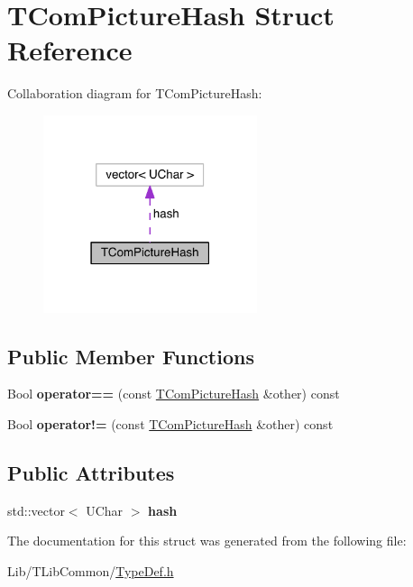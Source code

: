 \hypertarget{struct_t_com_picture_hash}{}\section{T\+Com\+Picture\+Hash Struct Reference}
\label{struct_t_com_picture_hash}


Collaboration diagram for T\+Com\+Picture\+Hash\+:
\nopagebreak
\begin{figure}[H]
\begin{center}
\leavevmode
\includegraphics[width=178pt]{d0/d47/struct_t_com_picture_hash__coll__graph}
\end{center}
\end{figure}
\subsection*{Public Member Functions}
\begin{DoxyCompactItemize}
\item 
\mbox{\label{struct_t_com_picture_hash_a3fdc9f3fff452ed4626ba643dc8b1b72}} 
Bool {\bfseries operator==} (const \hyperlink{struct_t_com_picture_hash}{T\+Com\+Picture\+Hash} \&other) const
\item 
\mbox{\label{struct_t_com_picture_hash_a4eafb377af56a5d7b83568e174556a17}} 
Bool {\bfseries operator!=} (const \hyperlink{struct_t_com_picture_hash}{T\+Com\+Picture\+Hash} \&other) const
\end{DoxyCompactItemize}
\subsection*{Public Attributes}
\begin{DoxyCompactItemize}
\item 
\mbox{\label{struct_t_com_picture_hash_a5284d19ca4e6bc835c650576582db31c}} 
std\+::vector$<$ U\+Char $>$ {\bfseries hash}
\end{DoxyCompactItemize}


The documentation for this struct was generated from the following file\+:\begin{DoxyCompactItemize}
\item 
Lib/\+T\+Lib\+Common/\hyperlink{_type_def_8h}{Type\+Def.\+h}\end{DoxyCompactItemize}
